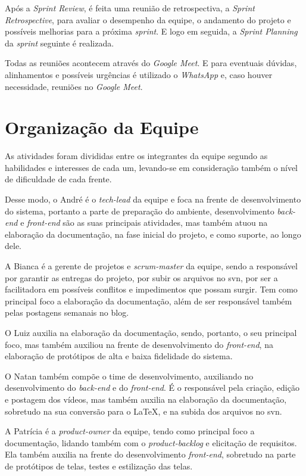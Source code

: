 Após a \textit{Sprint Review}, é feita uma reunião de retrospectiva, a \textit{Sprint Retrospective}, para avaliar o desempenho da equipe, o andamento do projeto e possíveis melhorias para a próxima \textit{\gls{sprint}}. E logo em seguida, a \textit{Sprint Planning} da \textit{\gls{sprint}} seguinte é realizada.


Todas as reuniões acontecem através do \textit{Google Meet}.
E para eventuais dúvidas, alinhamentos e possíveis urgências é utilizado o \textit{WhatsApp} e, caso houver necessidade, reuniões no \textit{Google Meet}. 


\section{Organização da Equipe}
As atividades foram divididas entre os integrantes da equipe segundo as habilidades e interesses de cada um, levando-se em consideração também o nível de dificuldade de cada frente.


Desse modo, o André é o \textit{\gls{tech-lead}} da equipe e foca na frente de desenvolvimento do sistema, portanto a parte de preparação do ambiente, desenvolvimento \textit{\gls{back-end}} e \textit{\gls{front-end}} são as suas principais atividades, mas também atuou na elaboração da documentação, na fase inicial do projeto, e como suporte, ao longo dele.

A Bianca é a gerente de projetos e \textit{\gls{scrum-master}} da equipe, sendo a responsável por garantir as entregas do projeto, por subir os arquivos no \ac{svn}, por ser a facilitadora em possíveis conflitos e impedimentos que possam surgir. Tem como principal foco a elaboração da documentação, além de ser responsável também pelas postagens semanais no blog.

O Luiz auxilia na elaboração da documentação, sendo, portanto, o seu principal foco, mas também auxiliou na frente de desenvolvimento do \textit{\gls{front-end}}, na elaboração de protótipos de alta e baixa fidelidade do sistema.

O Natan também compõe o time de desenvolvimento, auxiliando no desenvolvimento do \textit{\gls{back-end}} e do \textit{\gls{front-end}}. É o responsável pela criação, edição e postagem dos vídeos, mas também auxilia na elaboração da documentação, sobretudo na sua conversão para o LaTeX, e na subida dos arquivos no \ac{svn}.

A Patrícia é a \textit{\gls{product-owner}} da equipe, tendo como principal foco a documentação, lidando também com o \textit{\gls{product-backlog}} e elicitação de requisitos. Ela também auxilia na frente do desenvolvimento \textit{\gls{front-end}}, sobretudo na parte de protótipos de telas, testes e estilização das telas. 

